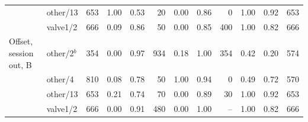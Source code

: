 \begin{tabular}{@{}l l r rrr rrr rrr@{}}
 & other/13 & 653 & 1.00 & 0.53 & 20 & 0.00 & 0.86 & 0 & 1.00 & 0.92 & 653 \\
 & valve1/2 & 666 & 0.09 & 0.86 & 50 & 0.00 & 0.85 & 400 & 1.00 & 0.82 & 666 \\
Offset, session out, B & other/2$^{b}$ & 354 & 0.00 & 0.97 & 934 & 0.18 & 1.00 & 354 & 0.42 & 0.20 & 574 \\
 & other/4 & 810 & 0.08 & 0.78 & 50 & 1.00 & 0.94 & 0 & 0.49 & 0.72 & 570 \\
 & other/13 & 653 & 0.21 & 0.74 & 70 & 0.00 & 0.89 & 30 & 1.00 & 0.92 & 653 \\
 & valve1/2 & 666 & 0.00 & 0.91 & 480 & 0.00 & 1.00 & -- & 1.00 & 0.82 & 666 \\
\bottomrule
\end{tabular}
